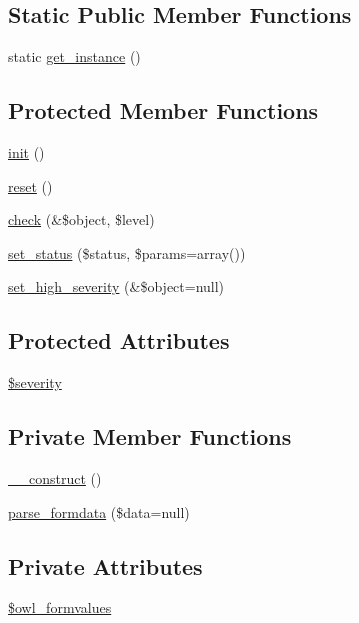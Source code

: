 \subsection*{Static Public Member Functions}
\begin{DoxyCompactItemize}
\item 
static \hyperlink{classFormHandler_ad5b352905583faed17034459f1a9ea6c}{get\_\-instance} ()
\end{DoxyCompactItemize}
\subsection*{Protected Member Functions}
\begin{DoxyCompactItemize}
\item 
\hyperlink{class__OWL_ae0ef3ded56e8a6b34b6461e5a721cd3e}{init} ()
\item 
\hyperlink{class__OWL_a2f2a042bcf31965194c03033df0edc9b}{reset} ()
\item 
\hyperlink{class__OWL_ad6f4f6946f40199dd0333cf219fa500e}{check} (\&\$object, \$level)
\item 
\hyperlink{class__OWL_aea912d0ede9b3c2a69b79072d94d4787}{set\_\-status} (\$status, \$params=array())
\item 
\hyperlink{class__OWL_a576829692a3b66e3d518853bf43abae3}{set\_\-high\_\-severity} (\&\$object=null)
\end{DoxyCompactItemize}
\subsection*{Protected Attributes}
\begin{DoxyCompactItemize}
\item 
\hyperlink{class__OWL_ad26b40a9dbbacb33e299b17826f8327c}{\$severity}
\end{DoxyCompactItemize}
\subsection*{Private Member Functions}
\begin{DoxyCompactItemize}
\item 
\hyperlink{classFormHandler_a1ef7ad4fe143dd8339c8ab66423a1934}{\_\-\_\-construct} ()
\item 
\hyperlink{classFormHandler_aef73c198dbc5de4e84f6c2a23b8b294c}{parse\_\-formdata} (\$data=null)
\end{DoxyCompactItemize}
\subsection*{Private Attributes}
\begin{DoxyCompactItemize}
\item 
\hyperlink{classFormHandler_a2caca98eec368ff030f07f8024253527}{\$owl\_\-formvalues}
\end{DoxyCompactItemize}
